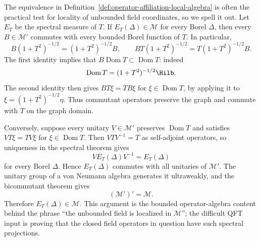 The equivalence in Definition~\ref{def:operator-affiliation-local-algebra} is
often the practical test for locality of unbounded field coordinates, so we
spell it out.  Let \(E_T\) be the spectral measure of \(T\).  If
\(E_T(\Delta)\in\mathcal M\) for every Borel \(\Delta\), then every
\(B\in\mathcal M'\) commutes with every bounded Borel function of \(T\).  In
particular,
\[
  B(1+T^2)^{-1/2}=(1+T^2)^{-1/2}B,
  \qquad
  BT(1+T^2)^{-1/2}=T(1+T^2)^{-1/2}B .
\]
The first identity implies that \(B\operatorname{Dom}T\subset\operatorname{Dom}T\):
indeed
\[
  \operatorname{Dom}T=(1+T^2)^{-1/2}\Hilb .
\]
The second identity then gives \(BT\xi=TB\xi\) for
\(\xi\in\operatorname{Dom}T\), by applying it to
\(\xi=(1+T^2)^{-1/2}\eta\).  Thus commutant operators preserve the graph and
commute with \(T\) on the graph domain.

Conversely, suppose every unitary \(V\in\mathcal M'\) preserves
\(\operatorname{Dom}T\) and satisfies \(VT\xi=TV\xi\) for
\(\xi\in\operatorname{Dom}T\).  Then \(VT V^{-1}=T\) as self-adjoint
operators, so uniqueness in the spectral theorem gives
\[
  V E_T(\Delta)V^{-1}=E_T(\Delta)
\]
for every Borel \(\Delta\).  Hence \(E_T(\Delta)\) commutes with all unitaries
of \(\mathcal M'\).  The unitary group of a von Neumann algebra generates it
ultraweakly, and the bicommutant theorem gives
\[
  (\mathcal M')'=\mathcal M .
\]
Therefore \(E_T(\Delta)\in\mathcal M\).  This argument is the bounded
operator-algebra content behind the phrase ``the unbounded field is localized
in \(\mathcal M\)''; the difficult QFT input is proving that the closed field
operators in question have such spectral projections.

